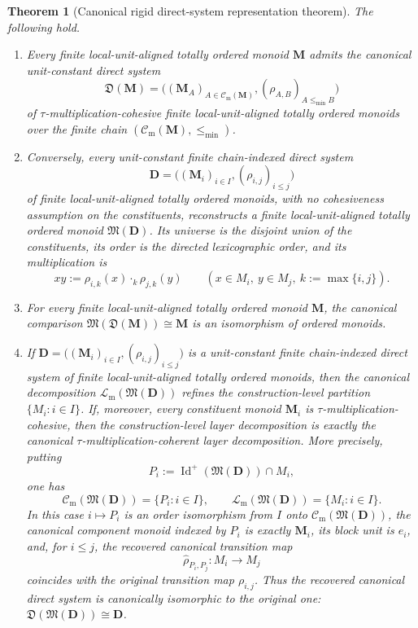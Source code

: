 \documentclass[pdflatex,sn-mathphys-num]{sn-jnl}
\makeatletter
\theoremstyle{thmstyleone}%
\newtheorem{theorem}{Theorem}[section]
\theoremstyle{thmstyletwo}%
\theoremstyle{thmstylethree}%
\newcommand{\PosId}{\operatorname{Id}^{+}}
\newcommand{\Cm}{\mathcal C_{\mathrm m}}
\newcommand{\Lm}{\mathcal L_{\mathrm m}}
\newcommand{\taggeditem}[2]{%
 \item[#1]%
 \def\@currentlabel{#1}%
 \label{#2}%
}
\makeatother
\begin{document}
\begin{theorem}[Canonical rigid direct-system representation theorem]\label{thm:representation}
The following hold.
\begin{enumerate}
\taggeditem{\textup{(i)}}{item:representation-canonical-direct-system}
Every finite local-unit-aligned totally ordered monoid \(\mathbf M\) admits the canonical unit-constant direct system
\[
\mathfrak D(\mathbf M)
=
\bigl((\mathbf M_A)_{A\in\Cm(\mathbf M)},(\rho_{A,B})_{A\le_{\min}B}\bigr)
\]
of \(\tau\)-multiplication-cohesive finite local-unit-aligned totally ordered monoids over the finite chain \((\Cm(\mathbf M),\le_{\min})\).

\taggeditem{\textup{(ii)}}{item:representation-reconstruction-from-direct-system}
Conversely, every unit-constant finite chain-indexed direct system
\[
\mathbf D=\bigl((\mathbf M_i)_{i\in I},(\rho_{i,j})_{i\le j}\bigr)
\]
of finite local-unit-aligned totally ordered monoids, with no cohesiveness assumption on the constituents, reconstructs a finite local-unit-aligned totally ordered monoid \(\mathfrak M(\mathbf D)\).
Its universe is the disjoint union of the constituents, its order is the directed lexicographic order, and its multiplication is
\[
xy:=\rho_{i,k}(x)\cdot_k\rho_{j,k}(y)
\qquad
(x\in M_i,\ y\in M_j,\ k:=\max\{i,j\}).
\]

\taggeditem{\textup{(iii)}}{item:representation-canonical-recovery}
For every finite local-unit-aligned totally ordered monoid \(\mathbf M\), the canonical comparison \(\mathfrak M(\mathfrak D(\mathbf M))\cong\mathbf M\) is an isomorphism of ordered monoids.

\taggeditem{\textup{(iv)}}{item:representation-direct-system-recovery}
If \(\mathbf D=\bigl((\mathbf M_i)_{i\in I},(\rho_{i,j})_{i\le j}\bigr)\) is a unit-constant finite chain-indexed direct system of finite local-unit-aligned totally ordered monoids, then the canonical decomposition \(\Lm(\mathfrak M(\mathbf D))\) refines the construction-level partition \(\{M_i:i\in I\}\).
If, moreover, every constituent monoid \(\mathbf M_i\) is \(\tau\)-multiplication-cohesive, then the construction-level layer decomposition is exactly the canonical \(\tau\)-multiplication-coherent layer decomposition.
More precisely, putting
\[
P_i:=\PosId(\mathfrak M(\mathbf D))\cap M_i,
\]
one has
\[
\Cm(\mathfrak M(\mathbf D))=\{P_i:i\in I\},
\qquad
\Lm(\mathfrak M(\mathbf D))=\{M_i:i\in I\}.
\]
In this case \(i\mapsto P_i\) is an order isomorphism from \(I\) onto \(\Cm(\mathfrak M(\mathbf D))\), the canonical component monoid indexed by \(P_i\) is exactly \(\mathbf M_i\), its block unit is \(e_i\), and, for \(i\le j\), the recovered canonical transition map
\[
\widehat\rho_{P_i,P_j}\colon M_i\to M_j
\]
coincides with the original transition map \(\rho_{i,j}\).
Thus the recovered canonical direct system is canonically isomorphic to the original one: \(\mathfrak D(\mathfrak M(\mathbf D))\cong\mathbf D\).
\end{enumerate}
\end{theorem}
\end{document}
